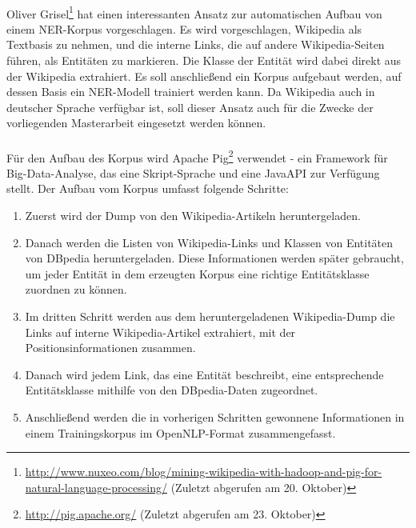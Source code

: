 \paragraph{}
Oliver Grisel\footnote{\url{http://www.nuxeo.com/blog/mining-wikipedia-with-hadoop-and-pig-for-natural-language-processing/} (Zuletzt abgerufen am 20. Oktober)} hat einen interessanten Ansatz zur automatischen Aufbau von einem NER-Korpus vorgeschlagen. Es wird vorgeschlagen, Wikipedia als Textbasis zu nehmen, und die interne Links, die auf andere Wikipedia-Seiten führen, als Entitäten zu markieren. Die Klasse der Entität wird dabei direkt aus der Wikipedia extrahiert. Es soll anschließend ein Korpus aufgebaut werden, auf dessen Basis ein NER-Modell trainiert werden kann. Da Wikipedia auch in deutscher Sprache verfügbar ist, soll dieser Ansatz auch für die Zwecke der vorliegenden Masterarbeit eingesetzt werden können.

\paragraph{}
Für den Aufbau des Korpus wird Apache Pig\footnote{\url{http://pig.apache.org/} (Zuletzt abgerufen am 23. Oktober)} verwendet - ein Framework für Big-Data-Analyse, das eine Skript-Sprache und eine JavaAPI zur Verfügung stellt. Der Aufbau vom Korpus umfasst folgende Schritte:
\begin{enumerate}
\item Zuerst wird der Dump von den Wikipedia-Artikeln heruntergeladen.
\item Danach werden die Listen von Wikipedia-Links und Klassen von Entitäten von DBpedia heruntergeladen. Diese Informationen werden später gebraucht, um jeder Entität in dem erzeugten Korpus eine richtige Entitätsklasse zuordnen zu können.
\item Im dritten Schritt werden aus dem heruntergeladenen Wikipedia-Dump die Links auf interne Wikipedia-Artikel extrahiert, mit der Positionsinformationen zusammen.
\item Danach wird jedem Link, das eine Entität beschreibt, eine entsprechende Entitätsklasse mithilfe von den DBpedia-Daten zugeordnet.
\item Anschließend werden die in vorherigen Schritten gewonnene Informationen in einem Trainingskorpus im OpenNLP-Format zusammengefasst.
\end{enumerate}

